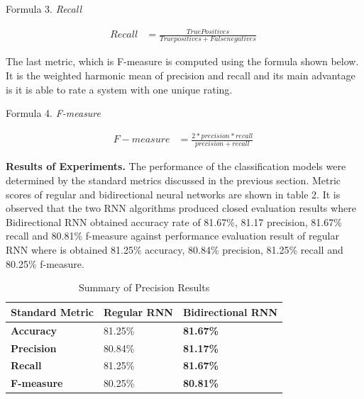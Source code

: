 \begin{center}
Formula 3. \textit{Recall}
\end{center}
\begin{equation}
\begin{align*}
Recall &= \frac{True Positives}{True positives+False negatives}\
\end{align*}
\end{equation}


The last metric, which is F-measure is computed using the formula shown below. It is the weighted harmonic mean of precision and recall and its main advantage is it is able to rate a system with one unique rating. 

\begin{center}
Formula 4. \textit{F-measure}
\end{center}
\begin{equation}
\begin{align*}
F - measure &= \frac{2*precision*recall}{precision + recall}\
\end{align*}
\end{equation}

\textbf{Results of Experiments.} The performance of the classification models were determined by the standard metrics discussed in the previous section. Metric scores of regular and bidirectional neural networks are shown in table 2. It is observed that the two RNN algorithms produced closed evaluation results where Bidirectional RNN obtained accuracy rate of  81.67\%, 81.17 precision, 81.67\% recall and 80.81\% f-measure against performance evaluation result of regular RNN where is obtained 81.25\% accuracy, 80.84\% precision, 81.25\% recall and 80.25\% f-measure.

\begin{table}[H]
	\centering
	\caption{Summary of Precision Results}
	\begin{tabular}{ | C{3cm}| C{3cm} | C{3.5cm} |}
	\hline
	\textbf{Standard Metric} & \textbf{Regular RNN} & \textbf{Bidirectional RNN}\\
	\hline 
	\textbf{Accuracy} & 81.25\% & \textbf{81.67\%}\\
	\hline
	\textbf{Precision} & 80.84\% & \textbf{81.17\%}\\
	\hline
	\textbf{Recall} & 81.25\% & \textbf{81.67\%}\\
	\hline
	\textbf{F-measure} & 80.25\% & \textbf{80.81\%}\\
	\hline
	\end{tabular}
\end{table}


